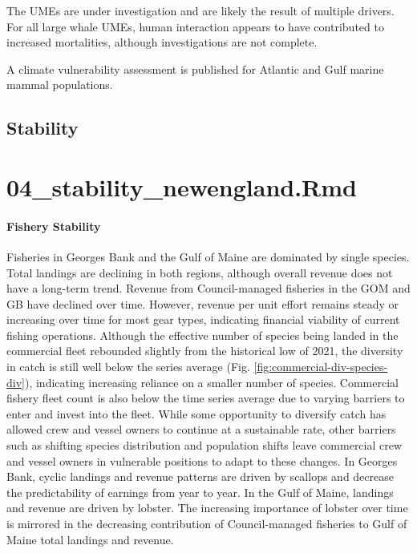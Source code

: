 \documentclass[
  10pt,
]{article}
\begin{document}
The UMEs are under investigation and are likely the result of multiple drivers. For all large whale UMEs, human interaction appears to have contributed to increased mortalities, although investigations are not complete.

A climate vulnerability assessment is published for Atlantic and Gulf marine mammal populations.

\subsection{Stability}\label{stability}

\section{04\_stability\_newengland.Rmd}\label{stability_newengland.rmd}

\paragraph{Fishery Stability}\label{fishery-stability}

Fisheries in Georges Bank and the Gulf of Maine are dominated by single species. Total landings are declining in both regions, although overall revenue does not have a long-term trend. Revenue from Council-managed fisheries in the GOM and GB have declined over time. However, revenue per unit effort remains steady or increasing over time for most gear types, indicating financial viability of current fishing operations. Although the effective number of species being landed in the commercial fleet rebounded slightly from the historical low of 2021, the diversity in catch is still well below the series average (Fig. \ref{fig:commercial-div-species-div}), indicating increasing reliance on a smaller number of species. Commercial fishery fleet count is also below the time series average due to varying barriers to enter and invest into the fleet. While some opportunity to diversify catch has allowed crew and vessel owners to continue at a sustainable rate, other barriers such as shifting species distribution and population shifts leave commercial crew and vessel owners in vulnerable positions to adapt to these changes. In Georges Bank, cyclic landings and revenue patterns are driven by scallops and decrease the predictability of earnings from year to year. In the Gulf of Maine, landings and revenue are driven by lobster. The increasing importance of lobster over time is mirrored in the decreasing contribution of Council-managed fisheries to Gulf of Maine total landings and revenue.
\end{document}
